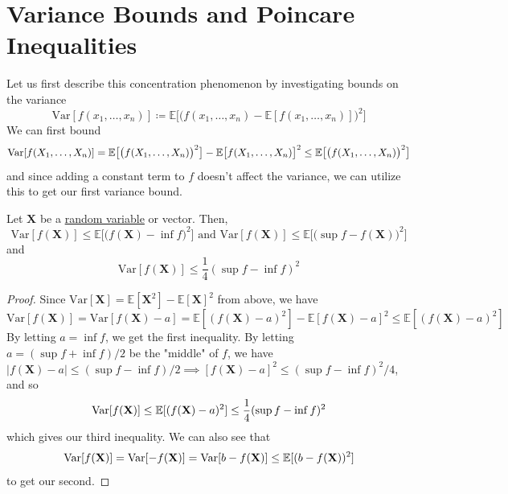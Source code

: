 \section{Variance Bounds and Poincare Inequalities}

  Let us first describe this concentration phenomenon by investigating bounds on the variance 
  \begin{equation}
    \mathrm{Var}[f(x_1, \ldots, x_n)] \coloneqq \mathbb{E}\big[ \big( f(x_1, \ldots, x_n) - \mathbb{E}[f(x_1, \ldots, x_n)] \big)^2 \big]
  \end{equation}
  We can first bound 
  \begin{equation}
    \operatorname{Var}[f(X_1, \ldots, X_n)] = \mathbb{E}\big[ \big( f(X_1, \ldots, X_n)\big)^2 \big] - \mathbb{E}\big[ f(X_1, \ldots, X_n) \big]^2 \leq \mathbb{E}\big[ \big( f(X_1, \ldots, X_n)\big)^2 \big]
  \end{equation}
  and since adding a constant term to $f$ doesn't affect the variance, we can utilize this to get our first variance bound. 

  \begin{lemma}
    \label{thm:efron-stein-inequality}
  Let $\mathbf{X}$ be a \hyperref[prob-def:random-variable]{random variable} or vector. Then, 
  \begin{equation}
    \mathrm{Var}[f(\mathbf{X})] \leq \mathbb{E} \big[ \big( f(\mathbf{X}) - \inf f \big)^2 \big] \text{ and } \mathrm{Var}[f(\mathbf{X})] \leq \mathbb{E} \big[ \big(\sup f - f(\mathbf{X}) \big)^2 \big]
  \end{equation}
  and 
  \begin{equation}
    \mathrm{Var}[ f(\mathbf{X})] \leq \frac{1}{4} ( \sup f - \inf f)^2
  \end{equation}
  \end{lemma}
  \begin{proof} 
  Since $\mathrm{Var}[\mathbf{X}] = \mathbb{E}[\mathbf{X}^2] - \mathbb{E}[\mathbf{X}]^2$ from above, we have 
  \begin{equation}
    \mathrm{Var}[ f(\mathbf{X})] = \mathrm{Var}[f(\mathbf{X}) - a] = \mathbb{E}[(f(\mathbf{X}) - a)^2] - \mathbb{E}[f(\mathbf{X}) - a]^2 \leq \mathbb{E}[(f(\mathbf{X}) - a)^2]
  \end{equation}
  By letting $a = \inf f$, we get the first inequality. By letting $a = (\sup f + \inf f) /2$ be the "middle" of $f$, we have $|f(\mathbf{X}) - a| \leq (\sup f - \inf f)/2 \implies [f(\mathbf{X}) - a]^2 \leq (\sup f - \inf f)^2/4$, and so 
  \begin{equation}
    \operatorname{Var}[ f(\mathbf{X})] \leq \mathbb{E}[(f(\mathbf{X}) - a)^2] \leq \frac{1}{4} (\sup f - \inf f)^2
  \end{equation}
  which gives our third inequality. We can also see that 
  \begin{equation}
    \mathrm{Var}[ f(\mathbf{X})] = \operatorname{Var}[ -f (\mathbf{X})] = \operatorname{Var}[ b - f(\mathbf{X})] \leq \mathbb{E}[ (b - f(\mathbf{X}))^2]
  \end{equation}
  to get our second. 
  \end{proof} 

